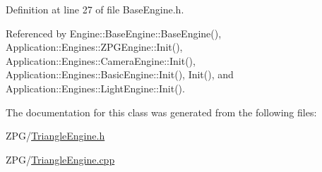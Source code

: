 Definition at line 27 of file Base\+Engine.\+h.



Referenced by Engine\+::\+Base\+Engine\+::\+Base\+Engine(), Application\+::\+Engines\+::\+Z\+P\+G\+Engine\+::\+Init(), Application\+::\+Engines\+::\+Camera\+Engine\+::\+Init(), Application\+::\+Engines\+::\+Basic\+Engine\+::\+Init(), Init(), and Application\+::\+Engines\+::\+Light\+Engine\+::\+Init().



The documentation for this class was generated from the following files\+:\begin{DoxyCompactItemize}
\item 
Z\+P\+G/\mbox{\hyperlink{TriangleEngine_8h}{Triangle\+Engine.\+h}}\item 
Z\+P\+G/\mbox{\hyperlink{TriangleEngine_8cpp}{Triangle\+Engine.\+cpp}}\end{DoxyCompactItemize}
